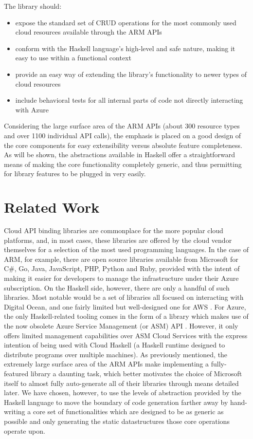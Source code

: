 \documentclass[11pt]{report}
\begin{document}
The library should:
\begin{itemize}
    \item{} expose the standard set of CRUD operations for the most commonly
        used cloud resources available through the ARM APIs
    \item{} conform with the Haskell language's high-level and safe nature,
        making it easy to use within a functional context
    \item{} provide an easy way of extending the library's functionality to
        newer types of cloud resources
    \item{} include behavioral tests for all internal parts of code not
        directly interacting with Azure
\end{itemize}
Considering the large surface area of the ARM APIs (about 300 resource
types and over 1100 individual API calls), the emphasis is placed on a
good design of the core components for easy extensibility versus absolute
feature completeness. As will be shown, the abstractions available in Haskell
offer a straightforward means of making the core functionality completely
generic, and thus permitting for library features to be plugged in very easily.


\section{Related Work}

Cloud API binding libraries are commonplace for the more popular cloud
platforms, and, in most cases, these libraries are offered by the cloud vendor
themselves for a selection of the most used programming languages.
In the case of ARM, for example, there are open source libraries
\cite{listOfAzureSDKs} available from Microsoft for C\#, Go, Java, JavaScript,
PHP, Python and Ruby, provided with the intent of making it easier for
developers to manage the infrastructure under their Azure subscription. \newline
On the Haskell side, however, there are only a handful of such libraries. Most
notable would be a set of libraries all focused on interacting with Digital
Ocean, and one fairly limited but well-designed one for AWS\@
\cite{niceAwsSdk}. For Azure, the only Haskell-related tooling comes in the
form of a library which makes use of the now obsolete Azure Service Management
(or ASM) API \cite{distributedProcessAzure}. However, it only offers limited
management capabilities over ASM Cloud Services with the express intention
of being used with Cloud Haskell (a Haskell runtime designed to distribute
programs over multiple machines). \newline
As previously mentioned, the extremely large surface area of the ARM APIs make
implementing a fully-featured library a daunting task, which better motivates the
choice of Microsoft itself to almost fully auto-generate all of their libraries
through means detailed later. We have chosen, however, to use the levels of
abstraction provided by the Haskell language to move the boundary of code
generation farther away by hand-writing a core set of functionalities which are
designed to be as generic as possible and only generating the static datastructures
those core operations operate upon.
\end{document}
